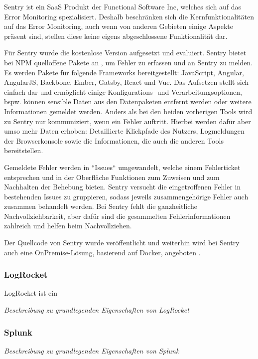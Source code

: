 Sentry \cite{Sentry} ist ein SaaS Produkt der Functional Software Inc, welches sich auf das Error Monitoring spezialisiert. Deshalb beschränken sich die Kernfunktionalitäten auf das Error Monitoring, auch wenn von anderen Gebieten einige Aspekte präsent sind, stellen diese keine eigens abgeschlossene Funktionalität dar.

Für Sentry wurde die kostenlose Version aufgesetzt und evaluiert. Sentry bietet bei NPM quelloffene Pakete an \cite{SentryJSGithub}, um Fehler zu erfassen und an Sentry zu melden. Es werden Pakete für folgende Frameworks bereitgestellt: JavaScript, Angular, AngularJS, Backbone, Ember, Gatsby, React und Vue. Das Aufsetzen stellt sich einfach dar und ermöglicht einige Konfigurations- und Verarbeitungsoptionen, bspw. können sensible Daten aus den Datenpaketen entfernt werden oder weitere Informationen gemeldet werden. Anders als bei den beiden vorherigen Tools wird zu Sentry nur kommuniziert, wenn ein Fehler auftritt. Hierbei werden dafür aber umso mehr Daten erhoben: Detaillierte Klickpfade des Nutzers, Logmeldungen der Browserkonsole sowie die Informationen, die auch die anderen Tools bereitstellen.

Gemeldete Fehler werden in ``Issues`` umgewandelt, welche einem Fehlerticket entsprechen und in der Oberfläche Funktionen zum Zuweisen und zum Nachhalten der Behebung bieten. Sentry versucht die eingetroffenen Fehler in bestehenden Issues zu gruppieren, sodass jeweils zusammengehörige Fehler auch zusammen behandelt werden. Bei Sentry fehlt die ganzheitliche Nachvollziehbarkeit, aber dafür sind die gesammelten Fehlerinformationen zahlreich und helfen beim Nachvollziehen.

Der Quellcode von Sentry wurde veröffentlicht und weiterhin wird bei Sentry auch eine OnPremise-Lösung, basierend auf Docker, angeboten \cite{SentrySelfHosted}.

\subsubsection{LogRocket}

LogRocket ist ein 

{\color{red}\textit{Beschreibung zu grundlegenden Eigenschaften von LogRocket}}

\subsubsection{Splunk}

{\color{red}\textit{Beschreibung zu grundlegenden Eigenschaften von Splunk}}

